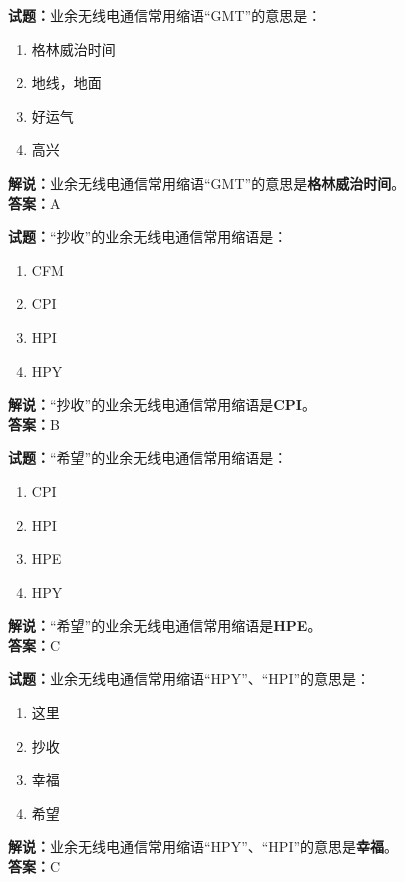 \documentclass{ctexbook}
\begin{document}
\bigskip


\noindent\textbf{试题：}业余无线电通信常用缩语“GMT”的意思是：
\begin{enumerate}[leftmargin=3em]
\item 格林威治时间
\item 地线，地面
\item 好运气
\item 高兴
\end{enumerate}
\noindent\textbf{解说：}业余无线电通信常用缩语“GMT”的意思是\textbf{格林威治时间}。\\\noindent\textbf{答案：}A



\bigskip


\noindent\textbf{试题：}“抄收”的业余无线电通信常用缩语是：
\begin{enumerate}[leftmargin=3em]
\item CFM
\item CPI
\item HPI
\item HPY
\end{enumerate}
\noindent\textbf{解说：}“抄收”的业余无线电通信常用缩语是\textbf{CPI}。\\\noindent\textbf{答案：}B



\bigskip


\noindent\textbf{试题：}“希望”的业余无线电通信常用缩语是：
\begin{enumerate}[leftmargin=3em]
\item CPI
\item HPI
\item HPE
\item HPY
\end{enumerate}
\noindent\textbf{解说：}“希望”的业余无线电通信常用缩语是\textbf{HPE}。\\\noindent\textbf{答案：}C



\bigskip


\noindent\textbf{试题：}业余无线电通信常用缩语“HPY”、“HPI”的意思是：
\begin{enumerate}[leftmargin=3em]
\item 这里
\item 抄收
\item 幸福
\item 希望
\end{enumerate}
\noindent\textbf{解说：}业余无线电通信常用缩语“HPY”、“HPI”的意思是\textbf{幸福}。\\\noindent\textbf{答案：}C
\end{document}
